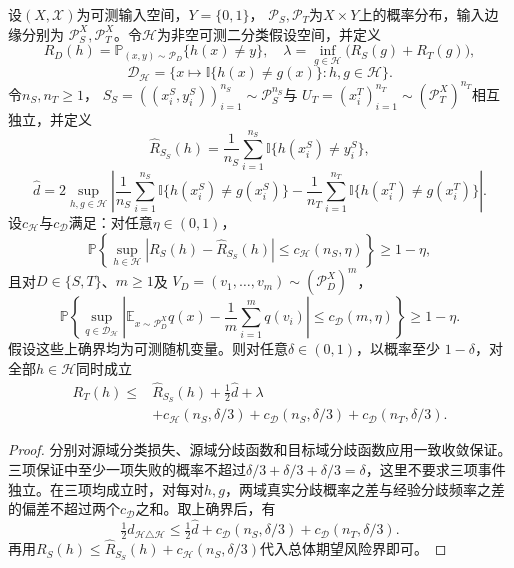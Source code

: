 \begin{theorem}[有限样本的领域自适应期望风险界]
\label{thm:adaptation-finite-sample}
设$(X,\mathcal X)$为可测输入空间，$Y=\{0,1\}$，
$\mathcal P_S,\mathcal P_T$为$X\times Y$上的概率分布，输入边缘分别为
$\mathcal P_S^X,\mathcal P_T^X$。令$\mathcal H$为非空可测二分类假设空间，并定义
\[
 R_D(h)=\mathbb P_{(x,y)\sim\mathcal P_D}\{h(x)\neq y\},
 \quad
 \lambda=\inf_{g\in\mathcal H}\bigl(R_S(g)+R_T(g)\bigr),
\]
\[
 \mathcal D_{\mathcal H}
 =\{x\mapsto\mathbb I\{h(x)\neq g(x)\}:h,g\in\mathcal H\}.
\]
令$n_S,n_T\geq1$，
$S_S=((x_i^S,y_i^S))_{i=1}^{n_S}\sim\mathcal P_S^{n_S}$与
$U_T=(x_i^T)_{i=1}^{n_T}\sim(\mathcal P_T^X)^{n_T}$相互独立，并定义
\[
 \widehat R_{S_S}(h)=\frac1{n_S}\sum_{i=1}^{n_S}
 \mathbb I\{h(x_i^S)\neq y_i^S\},
\]
\[
 \widehat d
 =2\sup_{h,g\in\mathcal H}\left|
 \frac1{n_S}\sum_{i=1}^{n_S}\mathbb I\{h(x_i^S)\neq g(x_i^S)\}
 -\frac1{n_T}\sum_{i=1}^{n_T}\mathbb I\{h(x_i^T)\neq g(x_i^T)\}
 \right|.
\]
设$c_{\mathcal H}$与$c_{\mathcal D}$满足：对任意$\eta\in(0,1)$，
\[
 \mathbb P\left\{\sup_{h\in\mathcal H}
 |R_S(h)-\widehat R_{S_S}(h)|
 \leq c_{\mathcal H}(n_S,\eta)\right\}\geq1-\eta,
\]
且对$D\in\{S,T\}$、$m\geq1$及
$V_D=(v_1,\ldots,v_m)\sim(\mathcal P_D^X)^m$，
\[
 \mathbb P\left\{\sup_{q\in\mathcal D_{\mathcal H}}
 \left|\mathbb E_{x\sim\mathcal P_D^X}q(x)
 -\frac1m\sum_{i=1}^m q(v_i)\right|
 \leq c_{\mathcal D}(m,\eta)\right\}\geq1-\eta.
\]
假设这些上确界均为可测随机变量。则对任意$\delta\in(0,1)$，以概率至少
$1-\delta$，对全部$h\in\mathcal H$同时成立
\begin{equation}
 \begin{aligned}
 R_T(h)\leq{}&\widehat R_{S_S}(h)+\tfrac12\widehat d+\lambda\\
 &+c_{\mathcal H}(n_S,\delta/3)
  +c_{\mathcal D}(n_S,\delta/3)
  +c_{\mathcal D}(n_T,\delta/3).
 \end{aligned}
 \label{eq:adaptation-vc-risk}
\end{equation}
\end{theorem}
\begin{proof}
分别对源域分类损失、源域分歧函数和目标域分歧函数应用一致收敛保证。三项保证中至少一项失败的概率不超过$\delta/3+\delta/3+\delta/3=\delta$，这里不要求三项事件独立。在三项均成立时，对每对$h,g$，两域真实分歧概率之差与经验分歧频率之差的偏差不超过两个$c_{\mathcal D}$之和。取上确界后，有
\[
 \tfrac12d_{\mathcal H\triangle\mathcal H}
 \leq\tfrac12\widehat d
 +c_{\mathcal D}(n_S,\delta/3)+c_{\mathcal D}(n_T,\delta/3).
\]
再用$R_S(h)\leq\widehat R_{S_S}(h)+c_{\mathcal H}(n_S,\delta/3)$代入总体期望风险界即可。
\end{proof}

